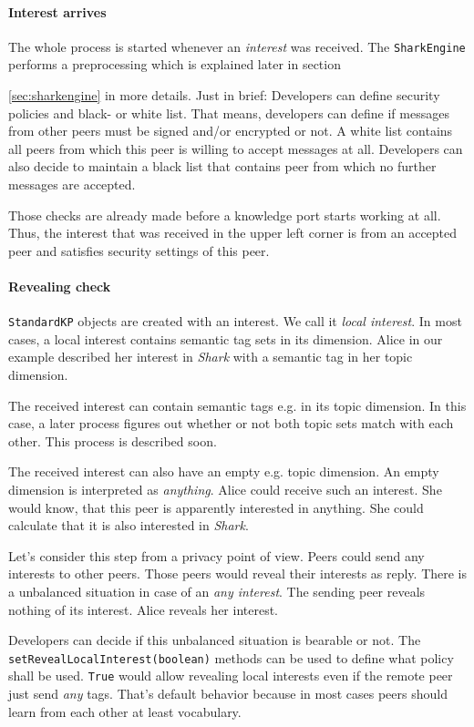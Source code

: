 \paragraph{Interest arrives}
The whole process is started whenever an {\it interest} was received. The {\tt SharkEngine} performs a preprocessing which is explained later in section {\ref{sec:sharkengine} in more details. Just in brief: Developers can define security policies and black- or white list. That means, developers can define if messages from other peers must be signed and/or encrypted or not. A white list contains all peers from which this peer is willing to accept messages at all. Developers can also decide to maintain a black list that contains peer from which no further messages are accepted.

Those checks are already made before a knowledge port starts working at all.
Thus, the interest that was received in the upper left corner is from an accepted peer and satisfies security settings of this peer.

\paragraph{Revealing check}
{\tt StandardKP} objects are created with an interest. We call it 
{\it local interest}. 
In most cases, a local interest contains semantic tag sets in its dimension. Alice in our example described her interest in {\it Shark} with a semantic tag in her topic dimension.

The received interest can contain semantic tags e.g. in its topic dimension. In this case, a later process figures out whether or not both topic sets match with each other. This process is described soon.

The received interest can also have an empty e.g. topic dimension. An empty dimension is interpreted as {\it anything}. Alice could receive such an interest. She would know, that this peer is apparently interested in anything. She could calculate that it is also interested in {\it Shark}.

Let's consider this step from a privacy point of view. Peers could send any interests to other peers. Those peers would reveal their interests as reply. There is a unbalanced situation in case of an {\it any interest}. The sending peer reveals nothing of its interest. Alice reveals her interest.

Developers can decide if this unbalanced situation is bearable or not. The {\tt setRevealLocalInterest(boolean)} methods can be used to define what policy shall be used. {\tt True} would allow revealing local interests even if the remote peer just send {\it any} tags. That's default behavior because in most cases peers should learn from each other at least vocabulary.

}

